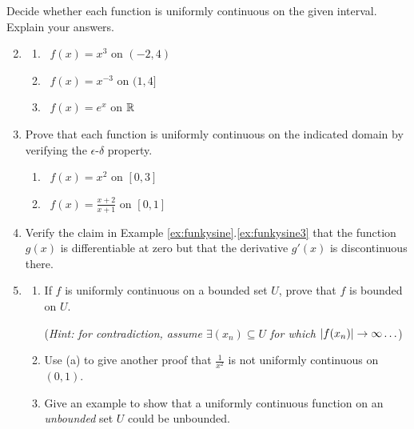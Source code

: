 \begin{exercisessec}{}{}
	\exstart Decide whether each function is uniformly continuous on the given interval.
	Explain your answers.
	\begin{enumerate}\setcounter{enumi}{1}
	 	\item[]\begin{enumerate}
	 	  \item {} \ $f(x)=x^3$ on $(-2,4)$
	 	  \setcounter{enumii}{2}
	 	  \item \makebox[180pt][l]{$f(x)=x^{-3}$ on $(0,4]$\hfill (d)} \ $f(x)=x^{-3}$ on $(1,4]$
	 	  \setcounter{enumii}{4}
	 	  \item {} \ $f(x)=e^x$ on $\mathbb{R}$
	 	\end{enumerate}
	 	 
  \item%
   Prove that each function is uniformly continuous on the indicated domain by verifying the $\epsilon$-$\delta$ property.
   \begin{enumerate}
	  \item {} \ $f(x)=x^2$ on $[0,3]$
	  \setcounter{enumii}{2}
	  \item \makebox[180pt][l]{$f(x)=\frac 1{x^2}$ on $[\frac 12,\infty)$\hfill (d)} \ $f(x)=\frac{x+2}{x+1}$ on $[0,1]$
  \end{enumerate}
  
  \item\label{exs:funkysine} Verify the claim in Example \ref*{ex:funkysine}.\ref{ex:funkysine3} that the function $g(x)$ is differentiable at zero\footnotemark{} but that the derivative $g'(x)$ is discontinuous there.
  
  \item%
  \begin{enumerate}
  	\item If $f$ is uniformly continuous on a bounded set $U$, prove that $f$ is bounded on $U$.\par
  	(\emph{Hint: for contradiction, assume $\exists (x_n)\subseteq U$ for which $\left| f(x_n)\right|\to\infty\ldots$})
  	\item Use (a) to give another proof that $\frac 1{x^2}$ is not uniformly continuous on $(0,1)$.
  	\item Give an example to show that a uniformly continuous function on an \emph{unbounded} set $U$ could be unbounded.
  \end{enumerate}
  

\end{enumerate}
\end{exercisessec}
